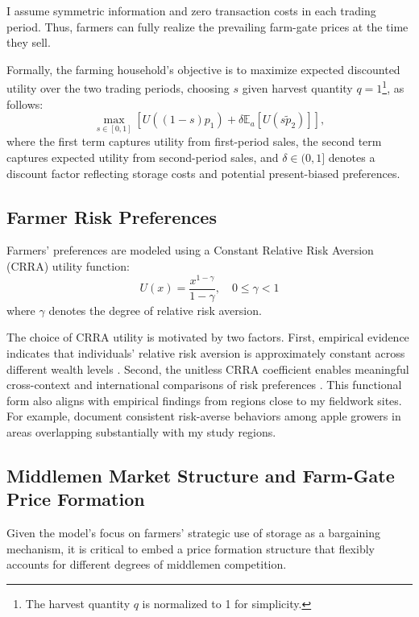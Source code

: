 I assume symmetric information and zero transaction costs in each trading period. Thus, farmers can fully realize the prevailing farm-gate prices at the time they sell.

Formally, the farming household's objective is to maximize expected discounted utility over the two trading periods, choosing $s$ given harvest quantity $q=1$\footnote{The harvest quantity $q$ is normalized to 1 for simplicity.}, as follows:
\begin{equation}
\label{eq:starting objective}
    \max_{s \in [0,1]} \left[ U\left((1-s) p_1\right) + \delta \mathbb{E}_a\left[ U\left(s \tilde{p}_2\right) \right] \right],
\end{equation}
where the first term captures utility from first-period sales, the second term captures expected utility from second-period sales, and $\delta \in (0,1]$ denotes a discount factor reflecting storage costs and potential present-biased preferences.

\subsection{Farmer Risk Preferences}
\noindent Farmers' preferences are modeled using a Constant Relative Risk Aversion (CRRA) utility function:
\begin{equation}
U(x) = \frac{x^{1-\gamma}}{1-\gamma},  \quad 0 \leq \gamma < 1
\label{eq: CRRA}
\end{equation}
where $\gamma$ denotes the degree of relative risk aversion.

The choice of CRRA utility is motivated by two factors. First, empirical evidence indicates that individuals’ relative risk aversion is approximately constant across different wealth levels \citep{chiappori2011relative}. Second, the unitless CRRA coefficient enables meaningful cross-context and international comparisons of risk preferences \citep{hardaker2000some}. This functional form also aligns with empirical findings from regions close to my fieldwork sites. For example, \citet{jin2024losses} document consistent risk-averse behaviors among apple growers in areas overlapping substantially with my study regions.

\subsection{Middlemen Market Structure and Farm-Gate Price Formation} \label{Section: Middlemen Market Structure and Farm-Gate Price Formation}
\noindent Given the model's focus on farmers' strategic use of storage as a bargaining mechanism, it is critical to embed a price formation structure that flexibly accounts for different degrees of middlemen competition.  

